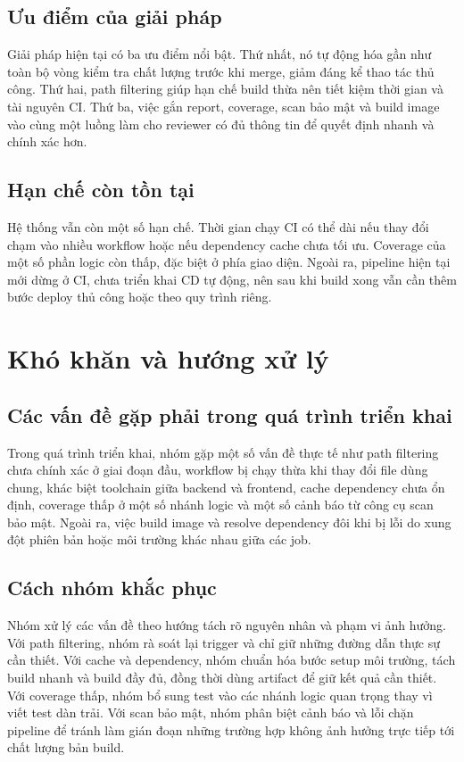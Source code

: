 \subsection{Ưu điểm của giải pháp}
Giải pháp hiện tại có ba ưu điểm nổi bật. Thứ nhất, nó tự động hóa gần như toàn bộ vòng kiểm tra chất lượng trước khi merge, giảm đáng kể thao tác thủ công. Thứ hai, path filtering giúp hạn chế build thừa nên tiết kiệm thời gian và tài nguyên CI. Thứ ba, việc gắn report, coverage, scan bảo mật và build image vào cùng một luồng làm cho reviewer có đủ thông tin để quyết định nhanh và chính xác hơn.

\subsection{Hạn chế còn tồn tại}
Hệ thống vẫn còn một số hạn chế. Thời gian chạy CI có thể dài nếu thay đổi chạm vào nhiều workflow hoặc nếu dependency cache chưa tối ưu. Coverage của một số phần logic còn thấp, đặc biệt ở phía giao diện. Ngoài ra, pipeline hiện tại mới dừng ở CI, chưa triển khai CD tự động, nên sau khi build xong vẫn cần thêm bước deploy thủ công hoặc theo quy trình riêng.

\section{Khó khăn và hướng xử lý}

\subsection{Các vấn đề gặp phải trong quá trình triển khai}
Trong quá trình triển khai, nhóm gặp một số vấn đề thực tế như path filtering chưa chính xác ở giai đoạn đầu, workflow bị chạy thừa khi thay đổi file dùng chung, khác biệt toolchain giữa backend và frontend, cache dependency chưa ổn định, coverage thấp ở một số nhánh logic và một số cảnh báo từ công cụ scan bảo mật. Ngoài ra, việc build image và resolve dependency đôi khi bị lỗi do xung đột phiên bản hoặc môi trường khác nhau giữa các job.

\subsection{Cách nhóm khắc phục}
Nhóm xử lý các vấn đề theo hướng tách rõ nguyên nhân và phạm vi ảnh hưởng. Với path filtering, nhóm rà soát lại trigger và chỉ giữ những đường dẫn thực sự cần thiết. Với cache và dependency, nhóm chuẩn hóa bước setup môi trường, tách build nhanh và build đầy đủ, đồng thời dùng artifact để giữ kết quả cần thiết. Với coverage thấp, nhóm bổ sung test vào các nhánh logic quan trọng thay vì viết test dàn trải. Với scan bảo mật, nhóm phân biệt cảnh báo và lỗi chặn pipeline để tránh làm gián đoạn những trường hợp không ảnh hưởng trực tiếp tới chất lượng bản build.

